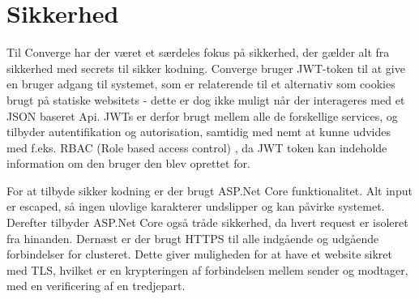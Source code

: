 \chapter{Sikkerhed}

Til Converge har der været et særdeles fokus på sikkerhed, der gælder alt fra sikkerhed med secrets til sikker kodning. Converge bruger JWT-token\cite{JSON-Web-Token} til at give en bruger adgang til systemet, som er relaterende til et alternativ som cookies brugt på statiske websitets - dette er dog ikke muligt når der interageres med et JSON baseret Api. JWTs er derfor brugt mellem alle de forskellige services, og tilbyder autentifikation og autorisation, samtidig med nemt at kunne udvides med f.eks. RBAC (Role based access control) \cite[RBAC]{converge-terms}, da JWT token kan indeholde information om den bruger den blev oprettet for.

For at tilbyde sikker kodning er der brugt ASP.Net Core funktionalitet. Alt input er escaped, så ingen ulovlige karakterer undslipper og kan påvirke systemet. Derefter tilbyder ASP.Net Core også tråde sikkerhed, da hvert request er isoleret fra hinanden. Dernæst er der brugt HTTPS til alle indgående og udgående forbindelser for clusteret. Dette giver muligheden for at have et website sikret med TLS, hvilket er en krypteringen af forbindelsen mellem sender og modtager, med en verificering af en tredjepart.
